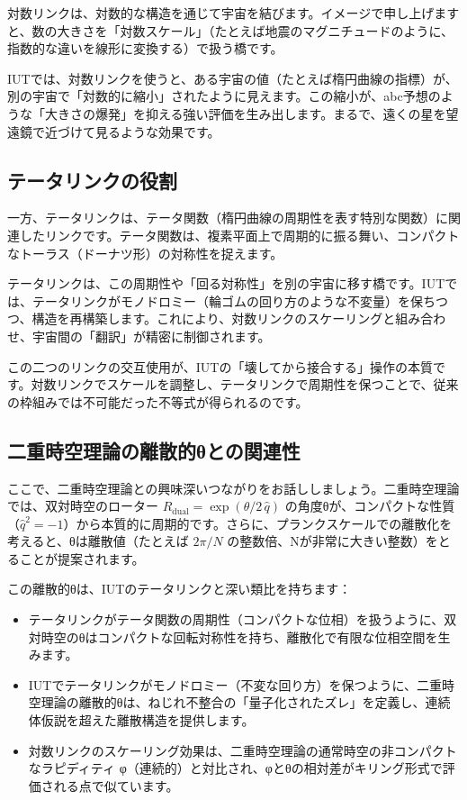 \documentclass[dvipdfmx,12pt,a4paper]{jsarticle}
\begin{document}
対数リンクは、対数的な構造を通じて宇宙を結びます。イメージで申し上げますと、数の大きさを「対数スケール」（たとえば地震のマグニチュードのように、指数的な違いを線形に変換する）で扱う橋です。

IUTでは、対数リンクを使うと、ある宇宙の値（たとえば楕円曲線の指標）が、別の宇宙で「対数的に縮小」されたように見えます。この縮小が、abc予想のような「大きさの爆発」を抑える強い評価を生み出します。まるで、遠くの星を望遠鏡で近づけて見るような効果です。

\subsection{テータリンクの役割}

一方、テータリンクは、テータ関数（楕円曲線の周期性を表す特別な関数）に関連したリンクです。テータ関数は、複素平面上で周期的に振る舞い、コンパクトなトーラス（ドーナツ形）の対称性を捉えます。

テータリンクは、この周期性や「回る対称性」を別の宇宙に移す橋です。IUTでは、テータリンクがモノドロミー（輪ゴムの回り方のような不変量）を保ちつつ、構造を再構築します。これにより、対数リンクのスケーリングと組み合わせ、宇宙間の「翻訳」が精密に制御されます。

この二つのリンクの交互使用が、IUTの「壊してから接合する」操作の本質です。対数リンクでスケールを調整し、テータリンクで周期性を保つことで、従来の枠組みでは不可能だった不等式が得られるのです。

\subsection{二重時空理論の離散的θとの関連性}

ここで、二重時空理論との興味深いつながりをお話ししましょう。二重時空理論では、双対時空のローター $R_{\text{dual}} = \exp(\theta/2 \, \hat{q})$ の角度θが、コンパクトな性質（$\hat{q}^2 = -1$）から本質的に周期的です。さらに、プランクスケールでの離散化を考えると、θは離散値（たとえば $2\pi / N$ の整数倍、Nが非常に大きい整数）をとることが提案されます。

この離散的θは、IUTのテータリンクと深い類比を持ちます：
\begin{itemize}
  \item テータリンクがテータ関数の周期性（コンパクトな位相）を扱うように、双対時空のθはコンパクトな回転対称性を持ち、離散化で有限な位相空間を生みます。
  \item IUTでテータリンクがモノドロミー（不変な回り方）を保つように、二重時空理論の離散的θは、ねじれ不整合の「量子化されたズレ」を定義し、連続体仮説を超えた離散構造を提供します。
  \item 対数リンクのスケーリング効果は、二重時空理論の通常時空の非コンパクトなラピディティ φ（連続的）と対比され、φとθの相対差がキリング形式で評価される点で似ています。
\end{itemize}
\end{document}
